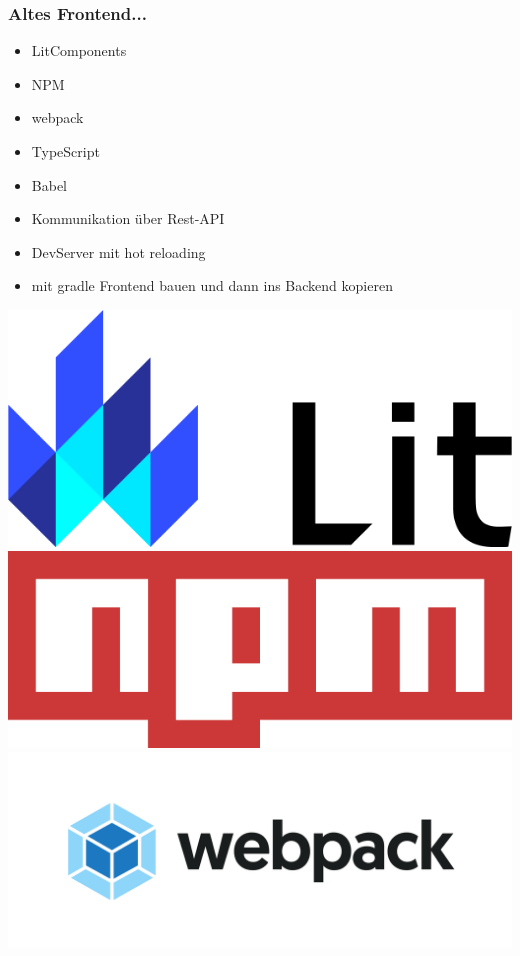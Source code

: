 \begin{frame}
\frametitle{Altes Frontend...}
\begin{minipage}{0.5\textwidth}
\begin{itemize}
\item LitComponents
\item NPM
\item webpack
\item TypeScript
\item Babel
\item Kommunikation über Rest-API
\item DevServer mit hot reloading
\item mit gradle Frontend bauen und dann ins Backend kopieren
\end{itemize}
\end{minipage}
\begin{minipage}{0.49\textwidth}
\begin{center}
\includegraphics[height=0.175\textheight]{lit}\\[12pt]
\includegraphics[height=0.175\textheight]{npm}\\[12pt]
\includegraphics[height=0.175\textheight]{webpack}\\[12pt]

\end{center}
\end{minipage}
\end{frame}
